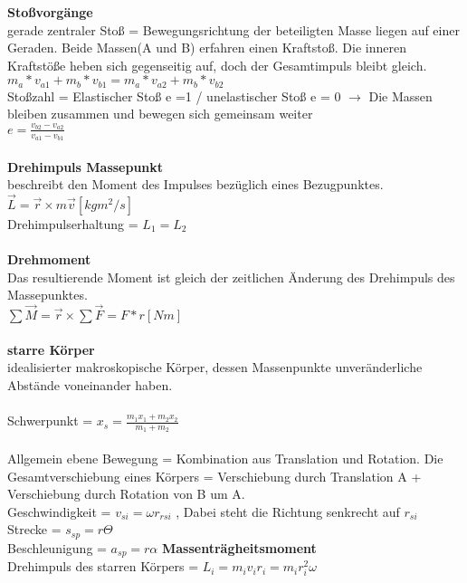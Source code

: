 \documentclass[8pt]{article}
\begin{document}
\noindent
\textbf{Stoßvorgänge}\\
gerade zentraler Stoß = Bewegungsrichtung der beteiligten Masse liegen auf einer Geraden. Beide Massen(A und B) erfahren einen Kraftstoß. Die inneren Kraftstöße heben sich gegenseitig auf, doch der Gesamtimpuls bleibt gleich. \\
$m_a*v_{a1}+m_b*v_{b1} = m_a*v_{a2} + m_b*v_{b2}$ \\
Stoßzahl = Elastischer Stoß e =1 / unelastischer Stoß e = 0 $\rightarrow$ Die Massen bleiben zusammen und bewegen sich gemeinsam weiter 
\\$e = \frac{v_{b2}-v_{a2}}{v_{a1}-v_{b1}}$ \\ \\
\noindent
\textbf{Drehimpuls Massepunkt}\\
beschreibt den Moment des Impulses bezüglich eines Bezugpunktes. \\
$\overrightarrow{L} = \overrightarrow{r} \times m\overrightarrow{v} [kgm^2/s]$ \\
Drehimpulserhaltung = $L_1 = L_2$\\ \\
\noindent
\textbf{Drehmoment}\\
Das resultierende Moment ist gleich der zeitlichen Änderung des Drehimpuls des Massepunktes.\\
$\sum \overrightarrow{M} = \overrightarrow{r} \times \sum \overrightarrow{F} = F*r [Nm]$ \\ \\
\noindent 
\textbf{starre Körper}\\
idealisierter makroskopische Körper, dessen Massenpunkte unveränderliche Abstände voneinander haben. \\ \\
\noindent
Schwerpunkt = $x_s = \frac{m_1x_1 + m_2x_2}{m_1+m_2}$ \\ \\
\noindent
Allgemein ebene Bewegung = Kombination aus Translation und Rotation. Die Gesamtverschiebung eines Körpers = Verschiebung durch Translation A + Verschiebung durch Rotation von B um A.\\
Geschwindigkeit = $v_{si} = \omega r_{rsi}$ , Dabei steht die Richtung senkrecht auf $r_{si}$ \\
Strecke = $s_{sp} = r\Theta$ \\
Beschleunigung = $a_{sp} = r\alpha$ \newpage
\noindent
\textbf{Massenträgheitsmoment}\\
Drehimpuls des starren Körpers = $L_i = m_iv_ir_i = m_ir_i^2\omega$\\
\end{document}
